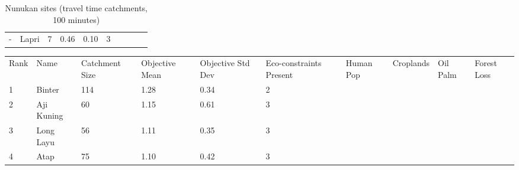 \begin{table}[ht]
\begin{tabular}{C{0.03\textwidth}C{0.12\textwidth}C{0.09\textwidth}C{0.08\textwidth}C{0.08\textwidth}C{0.08\textwidth}C{0.07\textwidth}C{0.07\textwidth}C{0.07\textwidth}C{0.07\textwidth}}
  {-} & Lapri &   7 & \textcolor[HTML]{000000}{0.46} & \textcolor[HTML]{000000}{0.10} & \textcolor[HTML]{000000}{3} &  &  &  &  \\ 
  \end{tabular}
\endgroup
\caption{Nunukan sites (travel time catchments, 100 minutes)} 
\label{tab:nunukan_time}
\end{table}
\begin{table}[ht]
\centering
\begingroup\fontsize{8pt}{9pt}\selectfont
\begin{tabular}{C{0.03\textwidth}C{0.12\textwidth}C{0.09\textwidth}C{0.08\textwidth}C{0.08\textwidth}C{0.08\textwidth}C{0.07\textwidth}C{0.07\textwidth}C{0.07\textwidth}C{0.07\textwidth}}
 Rank & Name & Catchment Size & Objective Mean & Objective Std Dev & Eco-constraints  Present & Human Pop & Croplands & Oil Palm & Forest Loss \\ 
 {1} & Binter & 114 & \textcolor[HTML]{FFFFFF}{1.28} & \textcolor[HTML]{000000}{0.34} & \textcolor[HTML]{000000}{2} &  &  &  &  \\ 
  {2} & Aji Kuning &  60 & \textcolor[HTML]{FFFFFF}{1.15} & \textcolor[HTML]{FFFFFF}{0.61} & \textcolor[HTML]{000000}{3} &  &  &  &  \\ 
  {3} & Long Layu &  56 & \textcolor[HTML]{FFFFFF}{1.11} & \textcolor[HTML]{000000}{0.35} & \textcolor[HTML]{000000}{3} &  &  &  &  \\ 
  {4} & Atap &  75 & \textcolor[HTML]{FFFFFF}{1.10} & \textcolor[HTML]{FFFFFF}{0.42} & \textcolor[HTML]{000000}{3} &  &  &  &  \\ 

\end{tabular}
\end{table}

